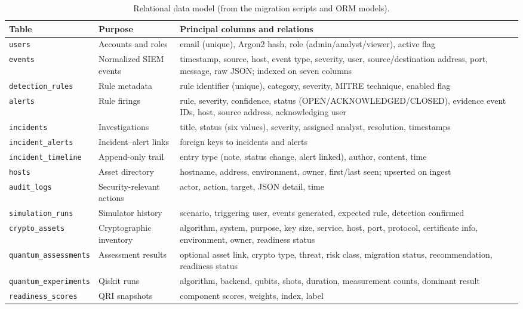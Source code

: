 \documentclass[conference]{IEEEtran}
\newcommand{\code}[1]{\texttt{#1}}
\begin{document}
\begin{table}[t]
\caption{Relational data model (from the migration scripts and ORM models).}
\label{tab:datamodel}
\centering
\footnotesize
\begin{tabularx}{\textwidth}{@{}l l X@{}}
\toprule
Table & Purpose & Principal columns and relations \\
\midrule
\code{users} & Accounts and roles & email (unique), Argon2 hash, role (admin/analyst/viewer), active flag \\
\code{events} & Normalized SIEM events & timestamp, source, host, event type, severity, user, source/destination address, port, message, raw JSON; indexed on seven columns \\
\code{detection\_rules} & Rule metadata & rule identifier (unique), category, severity, MITRE technique, enabled flag \\
\code{alerts} & Rule firings & rule, severity, confidence, status (OPEN/ACKNOWLEDGED/CLOSED), evidence event IDs, host, source address, acknowledging user \\
\code{incidents} & Investigations & title, status (six values), severity, assigned analyst, resolution, timestamps \\
\code{incident\_alerts} & Incident--alert links & foreign keys to incidents and alerts \\
\code{incident\_timeline} & Append-only trail & entry type (note, status change, alert linked), author, content, time \\
\code{hosts} & Asset directory & hostname, address, environment, owner, first/last seen; upserted on ingest \\
\code{audit\_logs} & Security-relevant actions & actor, action, target, JSON detail, time \\
\code{simulation\_runs} & Simulator history & scenario, triggering user, events generated, expected rule, detection confirmed \\
\code{crypto\_assets} & Cryptographic inventory & algorithm, system, purpose, key size, service, host, port, protocol, certificate info, environment, owner, readiness status \\
\code{quantum\_assessments} & Assessment results & optional asset link, crypto type, threat, risk class, migration status, recommendation, readiness status \\
\code{quantum\_experiments} & Qiskit runs & algorithm, backend, qubits, shots, duration, measurement counts, dominant result \\
\code{readiness\_scores} & QRI snapshots & component scores, weights, index, label \\
\bottomrule
\end{tabularx}
\end{table}
\end{document}
